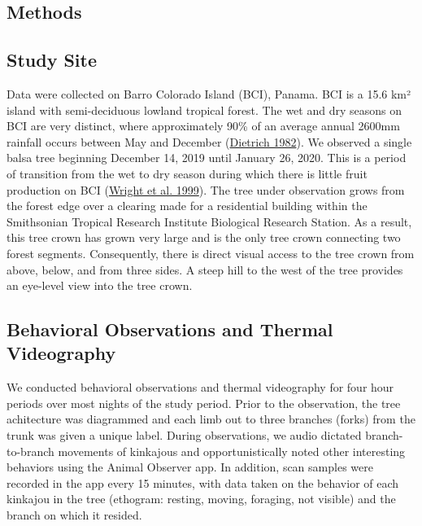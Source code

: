 \documentclass[twoside,12pt,final]{ucthesis-CA2012}
\begin{document}
\begin{ucmainmatter}
{\section{Methods}\label{methods-1}}

\hypertarget{study-site}{%
\subsection{Study Site}\label{study-site}}

Data were collected on Barro Colorado Island (BCI), Panama. BCI is a 15.6 km² island with semi-deciduous lowland tropical forest. The wet and dry seasons on BCI are very distinct, where approximately 90\% of an average annual 2600mm rainfall occurs between May and December (\protect\hyperlink{ref-dietrich1982geology}{Dietrich 1982}). We observed a single balsa tree beginning December 14, 2019 until January 26, 2020. This is a period of transition from the wet to dry season during which there is little fruit production on BCI (\protect\hyperlink{ref-wright1999}{Wright et al. 1999}). The tree under observation grows from the forest edge over a clearing made for a residential building within the Smithsonian Tropical Research Institute Biological Research Station. As a result, this tree crown has grown very large and is the only tree crown connecting two forest segments. Consequently, there is direct visual access to the tree crown from above, below, and from three sides. A steep hill to the west of the tree provides an eye-level view into the tree crown.

\hypertarget{behavioral-observations-and-thermal-videography}{%
\subsection{Behavioral Observations and Thermal Videography}\label{behavioral-observations-and-thermal-videography}}

We conducted behavioral observations and thermal videography for four hour periods over most nights of the study period. Prior to the observation, the tree achitecture was diagrammed and each limb out to three branches (forks) from the trunk was given a unique label. During observations, we audio dictated branch-to-branch movements of kinkajous and opportunistically noted other interesting behaviors using the Animal Observer app. In addition, scan samples were recorded in the app every 15 minutes, with data taken on the behavior of each kinkajou in the tree (ethogram: resting, moving, foraging, not visible) and the branch on which it resided.


\end{ucmainmatter}
\end{document}
